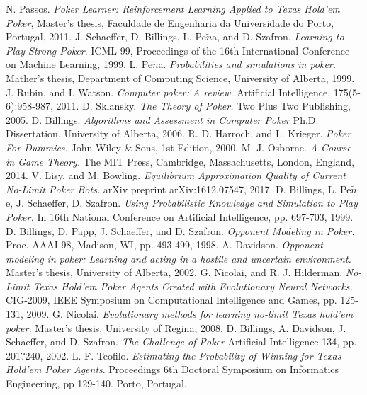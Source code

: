 
\begin{thebibliography}{9}
  N. Passos.
  \textit{Poker Learner: Reinforcement Learning Applied to Texas Hold'em Poker},
  Master's thesis, Faculdade de Engenharia da Universidade do Porto, Portugal, 
  2011.
  \href{https://paginas.fe.up.pt/$\sim$ei08029/Master\%20Thesis\%20-\%20Nuno\%20Passos.pdf}{}
   J. Schaeffer, D. Billings, L. Pe$\tilde{n}$a, and D. Szafron.
  \textit{Learning to Play Strong Poker}.
  ICML-99, Proceedings of the 16th International Conference on Machine Learning, 
  1999.
  \href{http://poker.cs.ualberta.ca/publications/ICML99.pdf}{}
  L. Pe$\tilde{n}$a.
  \textit{Probabilities and simulations in poker.}
  Mather's thesis, Department of Computing Science, University of Alberta,
  1999.
  J. Rubin, and I. Watson.
  \textit{Computer poker: A review.}
   Artificial Intelligence, 175(5-6):958-987,
  2011.
  D. Sklansky.
  \textit{The Theory of Poker.}
   Two Plus Two Publishing,
  2005.
  D. Billings.
  \textit{Algorithms and Assessment in Computer Poker}
   Ph.D. Dissertation, University of Alberta,
  2006.
  R. D. Harroch, and L. Krieger.
  \textit{Poker For Dummies.}
   John Wiley \& Sons, 1st Edition,
  2000.
  M. J. Osborne.
  \textit{A Course in Game Theory.}
   The MIT Press, Cambridge, Massachusetts, London, England,
  2014.
  V. Lisy, and M. Bowling.
  \textit{Equilibrium Approximation Quality of Current No-Limit Poker Bots.}
   arXiv preprint arXiv:1612.07547,
  2017.
  D. Billings, L. Pe$\tilde{n}$e, J. Schaeffer, D. Szafron.
  \textit{Using Probabilistic Knowledge and Simulation to Play Poker.}
   In 16th National Conference on Artificial
Intelligence, pp. 697-703,
  1999.
  D. Billings, D. Papp, J. Schaeffer, and D. Szafron.
  \textit{Opponent Modeling in Poker.}
   Proc. AAAI-98, Madison, WI, pp. 493-499,
  1998.
  A. Davidson.
  \textit{Opponent modeling in poker: Learning and acting in a hostile and uncertain environment.}
   Master’s thesis, University of Alberta, 
  2002.
G. Nicolai, and R. J. Hilderman.
\textit{No-Limit Texas Hold'em Poker Agents Created with Evolutionary Neural Networks.}
CIG-2009, IEEE Symposium on Computational Intelligence and Games, pp. 125-131, 2009.
G. Nicolai.
\textit{Evolutionary methods for learning no-limit Texas hold'em poker.} Master's thesis, University of Regina, 2008.
D. Billings, A. Davidson, J. Schaeffer, and D. Szafron.
\textit{The Challenge of Poker}
Artificial Intelligence 134, pp. 201?240, 2002.
L. F. Teofilo.
\textit{Estimating the Probability of Winning for Texas Hold'em Poker Agents}.
Proceedings 6th Doctoral Symposium on Informatics Engineering, pp 129-140. Porto, Portugal.
\end{thebibliography}


